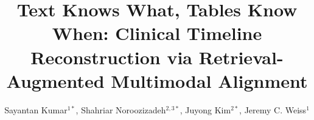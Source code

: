 \documentclass{ws-procs11x85}
\begin{document}
\title{Text Knows What, Tables Know When: Clinical Timeline Reconstruction via Retrieval-Augmented Multimodal Alignment}





\author{Sayantan Kumar$^{1\ast}$, Shahriar Noroozizadeh$^{2,3\ast}$, Juyong Kim$^{2\ast}$, Jeremy C. Weiss$^{1}$}

\address{
$^{1}$National Library of Medicine, National Institutes of Health, Bethesda, MD, USA\\
$^{2}$Machine Learning Department, Kenneth C. Griffin School of Computer Science, \\Carnegie Mellon University, Pittsburgh, PA, USA\\
$^{3}$Heinz College of Information Systems Management and Public Policy, \\Carnegie Mellon University, Pittsburgh, PA, USA\\
}
\end{document}
